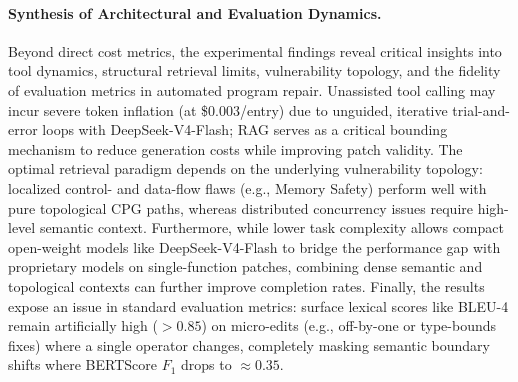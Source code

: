\paragraph{Synthesis of Architectural and Evaluation Dynamics.}
Beyond direct cost metrics, the experimental findings reveal critical insights into tool dynamics, structural retrieval limits, vulnerability topology, and the fidelity of evaluation metrics in automated program repair. 
Unassisted tool calling may incur severe token inflation (at \$0.003/entry) due to unguided, iterative trial-and-error loops with DeepSeek-V4-Flash; RAG serves as a critical bounding mechanism to reduce generation costs while improving patch validity. 
The optimal retrieval paradigm depends on the underlying vulnerability topology: localized control- and data-flow flaws (e.g., Memory Safety) perform well with pure topological CPG paths, whereas distributed concurrency issues require high-level semantic context. Furthermore, while lower task complexity allows compact open-weight models like DeepSeek-V4-Flash to bridge the performance gap with proprietary models on single-function patches, combining dense semantic and topological contexts can further improve completion rates. Finally, the results expose an issue in standard evaluation metrics: surface lexical scores like BLEU-4 remain artificially high ($>0.85$) on micro-edits (e.g., off-by-one or type-bounds fixes) where a single operator changes, completely masking semantic boundary shifts where BERTScore $F_1$ drops to $\approx 0.35$. 

